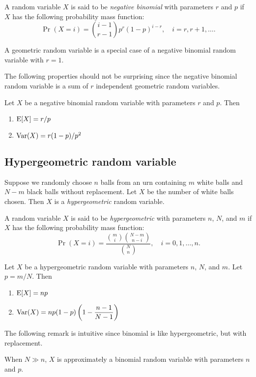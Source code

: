 \documentclass{article}
\begin{document}
\begin{definition}
  A random variable $X$ is said to be \emph{negative binomial} with parameters $r$ and $p$ if $X$ has the following probability mass function:
  \[
    \Pr(X = i) = \binom{i - 1}{r - 1} p^r (1 - p)^{i - r}, \quad i = r, r + 1, \ldots.
  \]
\end{definition}

\begin{remark}
  A geometric random variable is a special case of a negative binomial random variable with $r = 1$.
\end{remark}

The following properties should not be surprising since the negative binomial random variable is a sum of $r$ independent geometric random variables.

\begin{proposition}
  Let $X$ be a negative binomial random variable with parameters $r$ and $p$.
  Then
  \begin{enumerate}
    \item $\operatorname{E}[X] = r/p$
    \item $\operatorname{Var}(X) = r(1 - p)/p^2$
  \end{enumerate}
\end{proposition}


\subsection{Hypergeometric random variable}

Suppose we randomly choose $n$ balls from an urn containing $m$ white balls and $N - m$ black balls without replacement.
Let $X$ be the number of white balls chosen.
Then $X$ is a \emph{hypergeometric} random variable.

\begin{definition}
  A random variable $X$ is said to be \emph{hypergeometric} with parameters $n$, $N$, and $m$ if $X$ has the following probability mass function:
  \[
    \Pr(X = i) = \frac{\binom{m}{i} \binom{N - m}{n - i}}{\binom{N}{n}}, \quad i = 0, 1, \ldots, n.
  \]
\end{definition}

\begin{proposition}
  Let $X$ be a hypergeometric random variable with parameters $n$, $N$, and $m$.
  Let $p = m/N$.
  Then
  \begin{enumerate}
    \item $\operatorname{E}[X] = np$
    \item $\operatorname{Var}(X) = np(1 - p) \left(1 - \dfrac{n - 1}{N - 1} \right)$
  \end{enumerate}
\end{proposition}
The following remark is intuitive since binomial is like hypergeometric, but with replacement.
\begin{remark}
  When $N \gg n$, $X$ is approximately a binomial random variable with parameters $n$ and $p$.
\end{remark}
\end{document}
